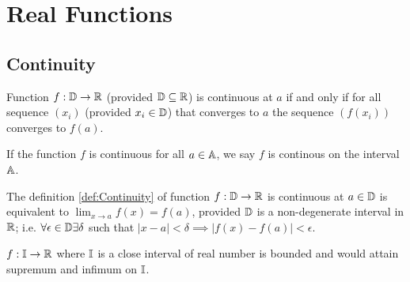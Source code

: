 \documentclass[../note.tex]{subfiles}
\begin{document}
\section{Real Functions}

\subsection{Continuity}

\begin{definition}\label{def:Continuity}
	Function $f: \mathbb{D} \rightarrow \mathbb{R}$ (provided $\mathbb{D} \subseteq \mathbb{R}$) is continuous at $a$
	if and only if for all sequence $(x_i)$ (provided $x_i \in \mathbb{D}$) that converges to $a$ the sequence $(f(x_i))$ converges to $f(a)$.

	If the function $f$ is continuous for all $a \in \mathbb{A}$, we say $f$ is continous on the interval $\mathbb{A}$.
\end{definition}

\begin{theorem}
	The definition \ref{def:Continuity} of function $f:\mathbb{D} \rightarrow \mathbb{R}$ is continuous at $a\in \mathbb{D}$ is equivalent to $\lim _{x\to a}f(x) = f(a)$, provided $\mathbb{D}$ is a non-degenerate interval in $\mathbb{R}$; 
	i.e. $\forall \epsilon \in \mathbb{D} \exists \delta $ such that $|x-a| < \delta \implies |f(x)-f(a)| < \epsilon$.
\end{theorem}

\begin{definition}
	$f:\mathbb{I} \rightarrow \mathbb{R}$ where $\mathbb{I}$ is a close interval of real number is bounded and would attain supremum and infimum on $\mathbb{I}$.
\end{definition}
\end{document}
